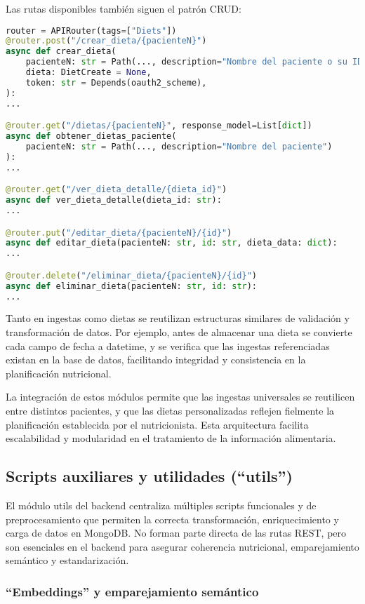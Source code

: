 Las rutas disponibles también siguen el patrón CRUD:
\begin{lstlisting}[language=Python, caption={Implementación de las rutas REST de dietas}]
router = APIRouter(tags=["Diets"])
@router.post("/crear_dieta/{pacienteN}")
async def crear_dieta(
    pacienteN: str = Path(..., description="Nombre del paciente o su ID"),
    dieta: DietCreate = None,
    token: str = Depends(oauth2_scheme),
):
...

@router.get("/dietas/{pacienteN}", response_model=List[dict])
async def obtener_dietas_paciente(
    pacienteN: str = Path(..., description="Nombre del paciente")
):
...

@router.get("/ver_dieta_detalle/{dieta_id}")
async def ver_dieta_detalle(dieta_id: str):
...

@router.put("/editar_dieta/{pacienteN}/{id}")
async def editar_dieta(pacienteN: str, id: str, dieta_data: dict):
...

@router.delete("/eliminar_dieta/{pacienteN}/{id}")
async def eliminar_dieta(pacienteN: str, id: str):
...
\end{lstlisting}
Tanto en ingestas como dietas se reutilizan estructuras similares de validación y transformación de datos. Por ejemplo, antes de almacenar una dieta se convierte cada campo de fecha a datetime, y se verifica que las ingestas referenciadas existan en la base de datos, facilitando integridad y consistencia en la planificación nutricional.

La integración de estos módulos permite que las ingestas universales se reutilicen entre distintos pacientes, y que las dietas personalizadas reflejen fielmente la planificación establecida por el nutricionista. Esta arquitectura facilita escalabilidad y modularidad en el tratamiento de la información alimentaria.

\subsection{Scripts auxiliares y utilidades (“utils”)}
El módulo utils del backend centraliza múltiples scripts funcionales y de preprocesamiento que permiten la correcta transformación, enriquecimiento y carga de datos en MongoDB. No forman parte directa de las rutas REST, pero son esenciales en el backend para asegurar coherencia nutricional, emparejamiento semántico y estandarización.

\subsubsection*{``Embeddings'' y emparejamiento semántico}

